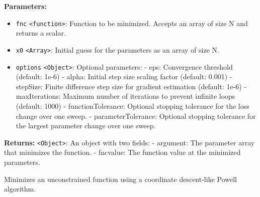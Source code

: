 \documentclass[12pt,a4paper]{article}
\begin{document}
\noindent \textbf{Parameters:}
\begin{itemize}
  \item \texttt{fnc} \texttt{<function>}: Function to be minimized. Accepts an array of size N and returns a scalar.
  \item \texttt{x0} \texttt{<Array>}: Initial guess for the parameters as an array of size N.
  \item \texttt{options} \texttt{<Object>}: Optional parameters:
- eps: Convergence threshold (default: 1e-6)
- alpha: Initial step size scaling factor (default: 0.001)
- stepSize: Finite difference step size for gradient estimation (default: 1e-6)
- maxIterations: Maximum number of iterations to prevent infinite loops (default: 1000)
- functionTolerance: Optional stopping tolerance for the loss change over one sweep.
- parameterTolerance: Optional stopping tolerance for the largest parameter change over one sweep.
\end{itemize}

\noindent \textbf{Returns:} \texttt{<Object>}: An object with two fields:
- argument: The parameter array that minimizes the function.
- fncvalue: The function value at the minimized parameters.

\noindent Minimizes an unconstrained function using a coordinate descent-like Powell algorithm.

\vspace{5mm}
\noindent {}
\end{document}

